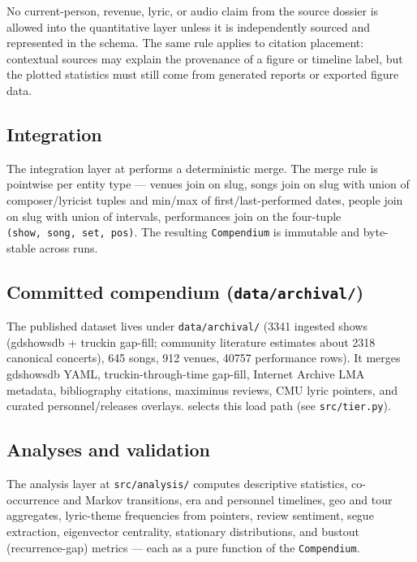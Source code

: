 \documentclass[
]{article}
\begin{document}
No current-person, revenue, lyric, or audio claim from the source
dossier is allowed into the quantitative layer unless it is
independently sourced and represented in the schema. The same rule
applies to citation placement: contextual sources may explain the
provenance of a figure or timeline label, but the plotted statistics
must still come from generated reports or exported figure data.

\subsection{Integration}\label{integration}

The integration layer at  performs
a deterministic merge. The merge rule is pointwise per entity type ---
venues join on slug, songs join on slug with union of composer/lyricist
tuples and min/max of first/last-performed dates, people join on slug
with union of intervals, performances join on the four-tuple
\texttt{(show,\ song,\ set,\ pos)}. The resulting \texttt{Compendium} is
immutable and byte-stable across runs.

\subsection{\texorpdfstring{Committed compendium
(\texttt{data/archival/})}{Committed compendium (data/archival/)}}\label{committed-compendium-dataarchival}

The published dataset lives under \texttt{data/archival/} (3341 ingested
shows (gdshowsdb + truckin gap-fill; community literature estimates
about 2318 canonical concerts), 645 songs, 912 venues, 40757
performance rows). It merges gdshowsdb YAML, truckin-through-time
gap-fill, Internet Archive LMA metadata, bibliography citations,
maximinus reviews, CMU lyric pointers, and curated personnel/releases
overlays.  selects this load path
(see \texttt{src/tier.py}).

\subsection{Analyses and validation}\label{analyses-and-validation}

The analysis layer at \texttt{src/analysis/} computes descriptive
statistics, co-occurrence and Markov transitions, era and personnel
timelines, geo and tour aggregates, lyric-theme frequencies from
pointers, review sentiment, segue extraction, eigenvector centrality,
stationary distributions, and bustout (recurrence-gap) metrics --- each
as a pure function of the \texttt{Compendium}.
\end{document}
